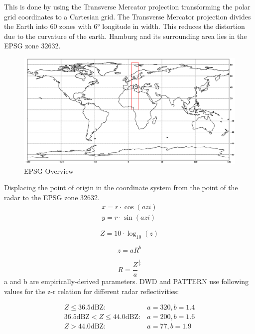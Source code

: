 \documentclass[11pt,twoside,a4paper,fleqn]{report}
\numberwithin{equation}{chapter}
\numberwithin{figure}{chapter}
\numberwithin{table}{chapter}
\begin{document}
This is done by using the Transverse Mercator projection transforming the polar grid coordinates to a Cartesian grid. The Transverse Mercator projection divides the Earth into 60 zones with  6° longitude in width. This reduces the distortion due to the curvature of the earth. Hamburg and its surrounding area lies in the EPSG zone 32632. 

\begin{figure}
	\centering
	\includegraphics[width=\textwidth]{EPSG.eps}
	\caption{EPSG Overview}
\end{figure}

Displacing the point of origin in the coordinate system from the point of the radar to the EPSG zone 32632.
\begin{equation}
	\begin{array}{lcl}
		x = r \cdot \cos(azi)\\
		y = r \cdot \sin(azi)
	\end{array}	
\end{equation}

\begin{equation}
	Z  = 10 \cdot \log _{10}(z)
\end{equation}

\begin{equation}
	z = aR^{b}
\end{equation}

\begin{equation}
	R = \frac{Z}{a}^{\frac{1}{b}}
\end{equation}
a and b are empirically-derived parameters. DWD and PATTERN use following values for the z-r relation for different radar reflectivities:

\begin{equation}
	\begin{array}{lcl}
		Z \le 36.5 \text{dBZ}: & a = 320, b = 1.4 \\
		36.5 \text{dBZ} < Z \le 44.0 \text{dBZ}: & a  = 200, b = 1.6 \\
		Z > 44.0 \text{dBZ}: & a = 77, b = 1.9
	\end{array}
\end{equation}
\end{document}
